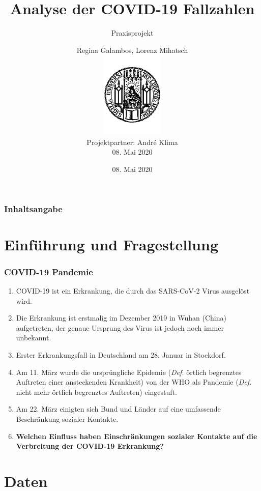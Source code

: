 \documentclass{beamer}
\title[Praxisprojekt: COVID-19]{Analyse der COVID-19 Fallzahlen}
\subtitle{Praxisprojekt}
\date{08. Mai 2020}
\author[R.Galambos, L.Mihatsch]{Regina Galambos, Lorenz Mihatsch\\
	\includegraphics[width=0.22\textwidth]{LMU.pdf}\\
	{\small Projektpartner: Andr\'{e} Klima}\\
	{\small 08. Mai 2020}}
\begin{document}
\begin{frame}
	\titlepage
\end{frame}

\begin{frame}
   \frametitle{Inhaltsangabe}
   \tableofcontents
 \end{frame}
 
 
 \section{Einführung und Fragestellung}
 \begin{frame}
 	\frametitle{COVID-19 Pandemie}
 	\begin{enumerate}
 		\item COVID-19 ist ein Erkrankung, die durch das SARS-CoV-2 Virus ausgelöst wird.
 		\item Die Erkrankung ist erstmalig im Dezember 2019 in Wuhan (China) aufgetreten, der genaue Ursprung des Virus ist jedoch noch immer unbekannt.
 		\item Erster Erkrankungsfall in Deutschland am 28. Januar in Stockdorf.
 		\item Am 11. März wurde die ursprüngliche Epidemie (\emph{Def.} örtlich begrenztes Auftreten einer ansteckenden Krankheit) von der WHO als Pandemie (\emph{Def.} nicht mehr örtlich begrenztes Auftreten) eingestuft.
 		\item Am 22. März einigten sich Bund und Länder auf eine umfassende Beschränkung sozialer Kontakte.
 		\pause
 		\item \textbf{Welchen Einfluss haben Einschränkungen sozialer Kontakte auf die Verbreitung der COVID-19 Erkrankung?}
 	\end{enumerate}
 \end{frame}
 \section{Daten}
  
\end{document}
